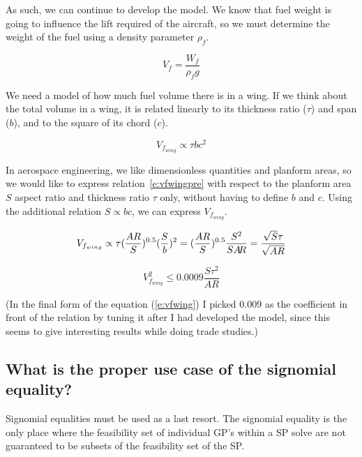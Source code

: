 As such, we can continue to develop the model. We know that fuel weight is going 
to influence the lift required of the aircraft, so we must determine the weight of the fuel 
using a density parameter $\rho_{f}$. 

\begin{equation}
    V_f = \frac{W_f } {\rho_f g}
    \label{e:vf}
\end{equation}

We need a model of how much fuel volume there is in a wing. If we think about the total
volume in a wing, it is related linearly to its thickness ratio ($\tau$) and span ($b$), 
and to the square of its chord ($c$). 

\begin{equation}
	V_{f_{wing}} \propto \tau b c^2
	\label{e:vfwingpre}
\end{equation} 

In aerospace engineering, we like dimensionless quantities and planform areas, 
so we would like to express relation~\ref{e:vfwingpre} with respect to the planform area $S$
aspect ratio \AR and thickness ratio $\tau$ only, without having to define $b$ and $c$. 
Using the additional relation $S \propto b c$, we can express $V_{f_{wing}}$. 

\begin{equation}
	V_{f_{wing}} \propto \tau (\frac{AR}{S})^{0.5} (\frac{S}{b})^2 = 
		(\frac{AR}{S})^{0.5} \frac{S^2}{S A\hspace{-2.0pt}R} = \frac{\sqrt{S}\tau}{\sqrt{AR}}
\end{equation}

\begin{equation}
    V_{f_{wing}}^2 \leq 0.0009 \frac{S \tau^2}{AR}
	\label{e:vfwing}
\end{equation}

(In the final form of the equation (\ref{e:vfwing}) I picked $0.009$ as the coefficient in front of the relation by tuning it after I had developed
the model, since this seems to give interesting results while doing trade studies.)

\subsection{What is the proper use case of the signomial equality?} 

Signomial equalities must be used as a last resort. The signomial equality is the only place 
where the feasibility set of individual \gls{GP}'s within a \gls{SP} solve are not guaranteed 
to be subsets of the feasibility set of the \gls{SP}. 